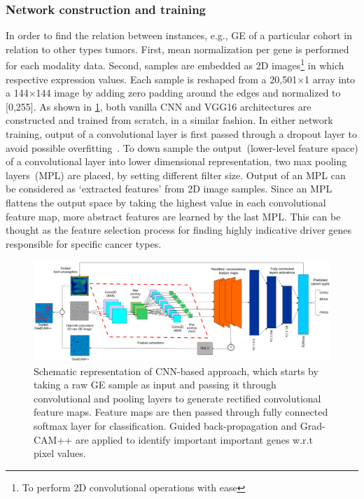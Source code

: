 \subsubsection{Network construction and training}
In order to find the relation between instances, e.g., GE of a particular cohort in relation to other types tumors. First, mean normalization per gene is performed for each modality data. Second, samples are embedded as 2D images\footnote{To perform 2D convolutional operations with ease} in which respective expression values. Each sample is reshaped from a 20,501$\times$1 array into a 144$\times$144 image by adding zero padding around the edges and normalized to [0,255].%
As shown in \cref{fig:clstm2}, both vanilla CNN and VGG16 architectures are constructed and trained from scratch, in a similar fashion. In either network training, output of a convolutional layer is first passed through a dropout layer to avoid possible overfitting~\cite{vardropout}. To down sample the output~(lower-level feature space) of a convolutional layer into lower dimensional representation, two max pooling layers~(MPL) are placed, by setting different filter size. Output of an MPL can be considered as `extracted features' from 2D image samples. Since an MPL flattens the output space by taking the highest value in each convolutional feature map, more abstract features are learned by the last MPL. This can be thought as the feature selection process for finding highly indicative driver genes responsible for specific cancer types.

\begin{figure}[h]
	\centering
	\includegraphics[scale=0.5]{images/clstm.PNG}
    \caption[Schematic representation of CNN-based approach]{Schematic representation of CNN-based approach, which starts by taking a raw GE sample as input and passing it through convolutional and pooling layers to generate rectified convolutional feature maps. Feature maps are then passed through fully connected softmax layer for classification. Guided back-propagation and Grad-CAM++ are applied to identify important important genes w.r.t pixel values.}	
	\label{fig:clstm2}
\end{figure}

